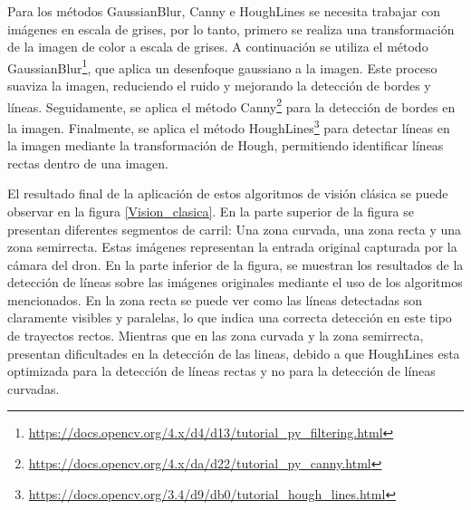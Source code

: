 Para los métodos GaussianBlur, Canny e HoughLines se necesita trabajar con imágenes en escala de grises, por lo tanto, primero se realiza una transformación de la imagen 
de color a escala de grises. A continuación se utiliza el método GaussianBlur\footnote{\url{https://docs.opencv.org/4.x/d4/d13/tutorial_py_filtering.html}}, que aplica un desenfoque 
gaussiano a la imagen. Este proceso suaviza la imagen, reduciendo el ruido y mejorando la detección de bordes y líneas. Seguidamente, se aplica el método Canny\footnote{\url{https://docs.opencv.org/4.x/da/d22/tutorial_py_canny.html}} 
para la detección de bordes en la imagen. Finalmente, se aplica el método HoughLines\footnote{\url{https://docs.opencv.org/3.4/d9/db0/tutorial_hough_lines.html}} 
para detectar líneas en la imagen mediante la transformación de Hough, permitiendo identificar líneas rectas dentro de una imagen. \newline

El resultado final de la aplicación de estos algoritmos de visión clásica se puede observar en la figura \ref{Vision_clasica}. En la parte superior de la figura se presentan diferentes segmentos
de carril: Una zona curvada, una zona recta y una zona semirrecta. Estas imágenes representan la entrada original capturada por la cámara del dron. En la parte inferior de la figura, 
se muestran los resultados de la detección de líneas sobre las imágenes originales mediante el uso de los algoritmos mencionados. En la zona recta se puede ver como las líneas
detectadas son claramente visibles y paralelas, lo que indica una correcta detección en este tipo de trayectos rectos. Mientras que en las zona curvada y la zona semirrecta, presentan
dificultades en la detección de las lineas, debido a que HoughLines esta optimizada para la detección de líneas rectas y no para la detección de líneas curvadas. 

